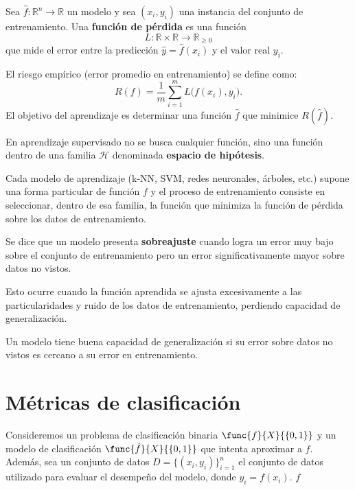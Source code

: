\documentclass[a4,11pt]{aleph-notas}
\begin{document}
\encabezado


\begin{defi}
Sea $\hat{f} : \mathbb{R}^n \to \mathbb{R}$ un modelo y sea $(x_i,y_i)$ una instancia del conjunto de entrenamiento.  
Una \textbf{función de pérdida} es una función
\[
    L : \mathbb{R} \times \mathbb{R} \to \mathbb{R}_{\ge 0}
\]
que mide el error entre la predicción $\hat{y}=\hat{f}(x_i)$ y el valor real $y_i$.  

El riesgo empírico (error promedio en entrenamiento) se define como:
\[
    R(f) = \frac{1}{m}\sum_{i=1}^{m} L\big(f(x_i),y_i\big).
\]
El objetivo del aprendizaje es determinar una función $\hat{f}$ que minimice $R(\hat{f})$.
\end{defi}

\begin{defi}[Hipótesis]
En aprendizaje supervisado no se busca cualquier función, sino una función dentro de una familia $\mathcal{H}$ denominada \textbf{espacio de hipótesis}.  

Cada modelo de aprendizaje (k-NN, SVM, redes neuronales, árboles, etc.) supone una forma particular de función $f$ y el proceso de entrenamiento consiste en seleccionar, dentro de esa familia, la función que minimiza la función de pérdida sobre los datos de entrenamiento.
\end{defi}

\begin{defi}[Sobreajuste]
Se dice que un modelo presenta \textbf{sobreajuste} cuando logra un error muy bajo sobre el conjunto de entrenamiento pero un error significativamente mayor sobre datos no vistos.  

Esto ocurre cuando la función aprendida se ajusta excesivamente a las particularidades y ruido de los datos de entrenamiento, perdiendo capacidad de generalización.
\end{defi}

\begin{defi}[Generalización]
Un modelo tiene buena capacidad de generalización si su error sobre datos no vistos es cercano a su error en entrenamiento.
\end{defi}


\section{Métricas de clasificación}

Consideremos un problema de clasificación binaria $\func{f}{X}{\{0,1\}}$ y un modelo de clasificación $\func{\hat{f}}{X}{\{0,1\}}$ que intenta aproximar a $f$. Además, sea un conjunto de datos $D = \{(x_i,y_i)\}_{i=1}^n$ el conjunto de datos utilizado para evaluar el desempeño del modelo, donde $y_i = f(x_i)$. ${f}$
\end{document}
